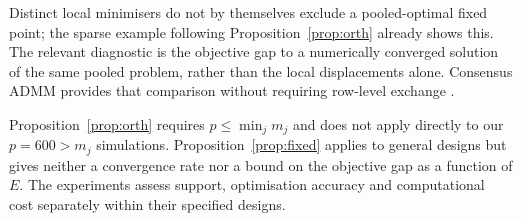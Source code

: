 Distinct local minimisers do not by themselves exclude a pooled-optimal
fixed point; the sparse example following Proposition~\ref{prop:orth}
already shows this. The relevant diagnostic is the objective gap to a
numerically converged solution of the same pooled problem, rather than
the local displacements alone. Consensus ADMM provides that comparison
without requiring row-level exchange \citep{boyd2011}.

\begin{remark}
Proposition~\ref{prop:orth} requires $p\le\min_jm_j$ and does not apply
directly to our $p=600>m_j$ simulations. Proposition~\ref{prop:fixed}
applies to general designs but gives neither a convergence rate nor a
bound on the objective gap as a function of $E$. The experiments assess
support, optimisation accuracy and computational cost separately within
their specified designs.
\end{remark}
